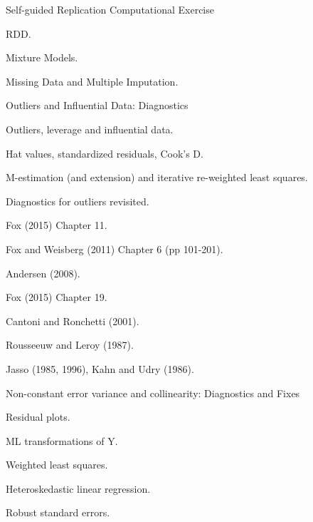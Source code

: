 \documentclass[letterpaper]{article}
\renewenvironment{itemize}{
  \begin{list}{}{
    \setlength{\leftmargin}{1.5em}
  }
}{
  \end{list}
}
\begin{document}
\begin{enumerate}
	

	\item Self-guided Replication Computational Exercise

			\begin{itemize}
				\item[$\square$] RDD.
				\item[$\square$] Mixture Models.
				\item[$\square$] Missing Data and Multiple Imputation.
			\end{itemize}




	\item Outliers and Influential Data: Diagnostics


			\begin{itemize}
				\item[$\square$] Outliers, leverage and influential data.
				\item[$\square$] Hat values, standardized residuals, Cook's D.
				\item[$\square$] M-estimation (and extension) and iterative re-weighted least squares.
				\item[$\square$] Diagnostics for outliers revisited.
			\end{itemize}


			\begin{itemize}
				\item[$\star$] Fox (2015) Chapter 11.
				\item[$\star$] Fox and Weisberg (2011) Chapter 6 (pp 101-201).
				\item[$\star$] Andersen (2008).
				\item[$\star$] Fox (2015) Chapter 19.
				\item[-] Cantoni and Ronchetti (2001).
				\item[-] Rousseeuw and Leroy (1987).
				\item[-] Jasso (1985, 1996), Kahn and Udry (1986).
			\end{itemize}



	\item Non-constant error variance and collinearity: Diagnostics and Fixes


			\begin{itemize}
				\item[$\square$] Residual plots.
				\item[$\square$] ML transformations of Y.
				\item[$\square$] Weighted least squares.
				\item[$\square$] Heteroskedastic linear regression.
				\item[$\square$] Robust standard errors.
			\end{itemize}




\end{enumerate}
\end{document}
